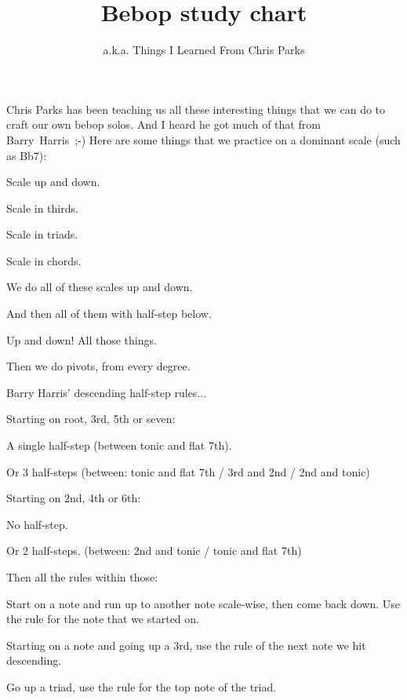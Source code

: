 \documentclass[a4paper,10pt,english]{article}
\title{\vspace{-5cm}Bebop study chart}
\author{\small a.k.a. Things I Learned From Chris Parks}
\begin{document}
\maketitle
Chris Parks has been teaching us all these interesting things that we can do to craft our own bebop solos. And I heard he got much of that from Barry~Harris~;-)
\linebreak
\linebreak
Here are some things that we practice on a dominant scale (such as Bb7):

  \begin{todolist}
    \item Scale up and down.
    \item Scale in thirds.
    \item Scale in triads.
    \item Scale in chords.
    \item We do all of these scales up and down.
    \item And then all of them with half-step below.
    \item Up and down! All those things.
    \item Then we do pivots, from every degree.
    \item Barry Harris' descending half-step rules...
    \item Starting on root, 3rd, 5th or seven:
    \begin{todolist}
      \item A single half-step (between tonic and flat 7th).
      \item Or 3 half-steps (between: tonic and flat 7th / 3rd and 2nd / 2nd and tonic)
    \end{todolist}
    \item Starting on 2nd, 4th or 6th:
    \begin{todolist}
      \item No half-step.
      \item Or 2 half-steps. (between: 2nd and tonic / tonic and flat 7th)
    \end{todolist}
    \item Then all the rules within those:
    \begin{todolist}
    \item Start on a note and run up to another note scale-wise, then come back down. Use the rule for the note that we started on.
    \item Starting on a note and going up a 3rd, use the rule of the next note we hit descending.
    \item Go up a triad, use the rule for the top note of the triad.

\end{todolist}
\end{todolist}
\end{document}
